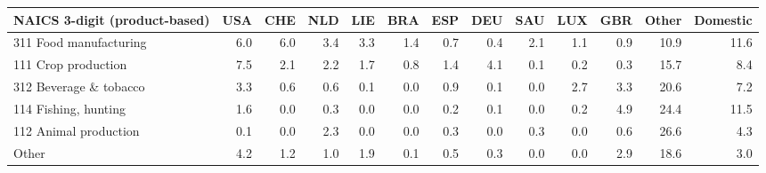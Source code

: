 \begin{tabular}{lrrrrrrrrrrrr}
\toprule
NAICS 3-digit (product-based) & USA & CHE & NLD & LIE & BRA & ESP & DEU & SAU & LUX & GBR & Other & Domestic \\
\midrule
311 Food manufacturing & 6.0 & 6.0 & 3.4 & 3.3 & 1.4 & 0.7 & 0.4 & 2.1 & 1.1 & 0.9 & 10.9 & 11.6 \\
111 Crop production & 7.5 & 2.1 & 2.2 & 1.7 & 0.8 & 1.4 & 4.1 & 0.1 & 0.2 & 0.3 & 15.7 & 8.4 \\
312 Beverage \& tobacco & 3.3 & 0.6 & 0.6 & 0.1 & 0.0 & 0.9 & 0.1 & 0.0 & 2.7 & 3.3 & 20.6 & 7.2 \\
114 Fishing, hunting & 1.6 & 0.0 & 0.3 & 0.0 & 0.0 & 0.2 & 0.1 & 0.0 & 0.2 & 4.9 & 24.4 & 11.5 \\
112 Animal production & 0.1 & 0.0 & 2.3 & 0.0 & 0.0 & 0.3 & 0.0 & 0.3 & 0.0 & 0.6 & 26.6 & 4.3 \\
Other & 4.2 & 1.2 & 1.0 & 1.9 & 0.1 & 0.5 & 0.3 & 0.0 & 0.0 & 2.9 & 18.6 & 3.0 \\
\bottomrule
\end{tabular}
